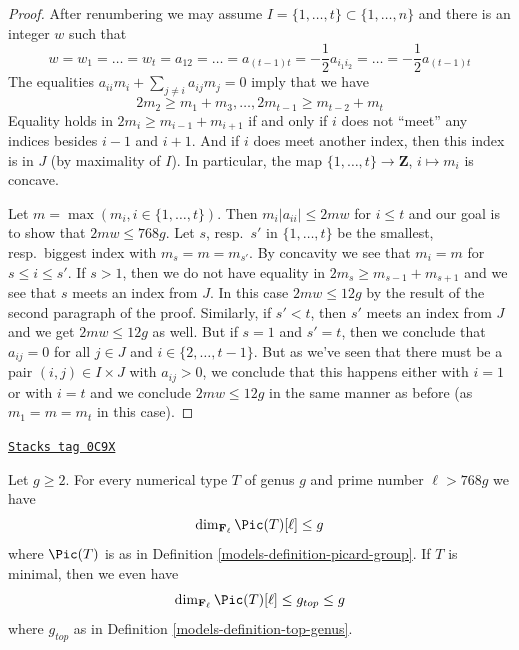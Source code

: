 \begin{proof}
\medskip\noindent
After renumbering we may assume $I = \{1, \ldots, t\} \subset \{1, \ldots, n\}$
and there is an integer $w$ such that
$$
w = w_1 = \ldots = w_t =
a_{12} = \ldots = a_{(t - 1) t} =
-\frac{1}{2} a_{i_1i_2} = \ldots = -\frac{1}{2} a_{(t - 1) t}
$$
The equalities $a_{ii}m_i + \sum_{j \not = i} a_{ij}m_j = 0$ imply
that we have
$$
2m_2 \geq m_1 + m_3, \ldots, 2m_{t - 1} \geq m_{t - 2} + m_t
$$
Equality holds in $2m_i \geq m_{i - 1} + m_{i + 1}$
if and only if $i$ does not ``meet'' any indices besides
$i - 1$ and $i + 1$. And if $i$ does meet
another index, then this index is in $J$ (by maximality of $I$).
In particular, the map
$\{1, \ldots, t\} \to \mathbf{Z}$, $i \mapsto m_i$ is concave.

\medskip\noindent
Let $m = \max(m_i, i \in \{1, \ldots, t\})$. Then
$m_i|a_{ii}| \leq 2mw$ for $i \leq t$ and
our goal is to show that $2mw \leq 768g$.
Let $s$, resp.\ $s'$ in $\{1, \ldots, t\}$ be the
smallest, resp.\ biggest index with $m_s = m = m_{s'}$.
By concavity we see that $m_i = m$ for $s \leq i \leq s'$.
If $s > 1$, then we do not have equality in
$2m_s \geq m_{s - 1} + m_{s + 1}$
and we see that $s$ meets an index from $J$.
In this case $2mw \leq 12g$ by the result of the second paragraph
of the proof.
Similarly, if $s' < t$, then $s'$ meets an index from $J$
and we get $2mw \leq 12g$ as well.
But if $s = 1$ and $s' = t$, then we conclude
that $a_{ij} = 0$ for all $j \in J$ and $i \in \{2, \ldots, t - 1\}$.
But as we've seen that there must be a pair $(i, j) \in I \times J$
with $a_{ij} > 0$, we conclude that this happens either with
$i = 1$ or with $i = t$ and we conclude $2mw \leq 12g$
in the same manner as before (as $m_1 = m = m_t$ in this case).
\end{proof}

\begin{proposition}
\label{models-proposition-bound-picard-group}
\href{https://stacks.math.columbia.edu/tag/0C9X}{\texttt{Stacks tag 0C9X}}

Let $g \geq 2$. For every numerical type $T$ of genus $g$
and prime number $\ell > 768g$ we have
$$
\dim_{\mathbf{F}_\ell} \Pic(T)[\ell] \leq g
$$
where $\Pic(T)$ is as in Definition \ref{models-definition-picard-group}.
If $T$ is minimal, then we even have
$$
\dim_{\mathbf{F}_\ell} \Pic(T)[\ell] \leq g_{top} \leq g
$$
where $g_{top}$ as in Definition \ref{models-definition-top-genus}.
\end{proposition}

